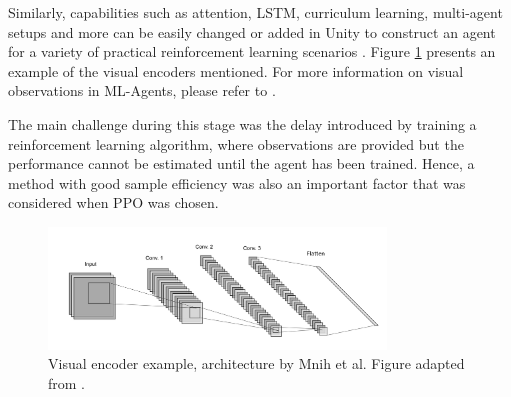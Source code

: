 Similarly, capabilities such as attention, LSTM, curriculum learning, multi-agent setups and more can be easily changed or added in Unity to construct an agent for a variety of practical reinforcement learning scenarios \cite{github-unity-mlagents-toolkit}. Figure \ref{fig:unity-simple-encoder} presents an example of the visual encoders mentioned. For more information on visual observations in ML-Agents, please refer to \cite{mlagents2022visualobservations}.

The main challenge during this stage was the delay introduced by training a reinforcement learning algorithm, where observations are provided but the performance cannot be estimated until the agent has been trained. Hence, a method with good sample efficiency was also an important factor that was considered when PPO was chosen.


\begin{figure}[!ht]
        \centering
        \includegraphics[width=0.8\textwidth]{images/simple_encoder.png}
        \caption{Visual encoder example, architecture by Mnih et al. Figure adapted from \cite{mnih2016asynchronous, github-unity-mlagents-toolkit}.
        }
        \label{fig:unity-simple-encoder}
\end{figure}






